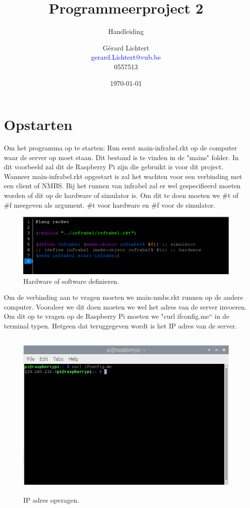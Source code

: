 \documentclass{article}
\title{Programmeerproject 2}
\subtitle{Handleiding}
\author{Gérard Lichtert\\
        \textcolor{blue}{gerard.Lichtert@vub.be}\\
        \textcolor{myblueish}{0557513}}
\date{\today}
\begin{document}
\maketitle
\tableofcontents
\pagebreak
\section{Opstarten}
Om het programma op te starten: Run eerst main-infrabel.rkt op de computer waar de server op moet staan. 
Dit bestand is te vinden in de "mains" folder. In dit voorbeeld zal dit de Raspberry Pi zijn die gebruikt is voor dit project.
Wanneer main-infrabel.rkt opgestart is zal het wachten voor een verbinding met een client of NMBS. Bij het runnen 
van infrabel zal er wel gespecifieerd moeten worden of dit op de hardware of simulator is.
Om dit te doen moeten we \#t of \#f meegeven als argument. \#t voor hardware en \#f voor de simulator. 
\begin{figure}[h]
    \centering
    \includegraphics[width=\textwidth]{Images/Screenshot_2.png}
    \caption{Hardware of software definieren.}
\end{figure}
Om de verbinding aan te vragen moeten we main-nmbs.rkt runnen op de andere computer.
Vooraleer we dit doen moeten we wel het adres van de server invoeren. Om dit op te vragen op de Raspberry Pi moeten we
"curl ifconfig.me`` in de terminal typen. Hetgeen dat teruggegeven wordt is het IP adres van de server.
\begin{figure}[h]
    \centering
    \includegraphics[width=\textwidth, height=8.5cm]{Images/Screenshot from 2021-05-14 05-33-24.png}
    \caption{IP adres opvragen.}
\end{figure}
\end{document}
